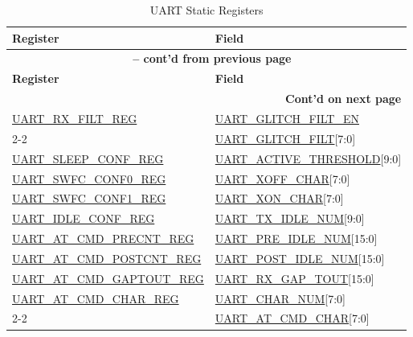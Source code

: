 \documentclass[main\_\_EN.tex]{subfiles}
\begin{document}
\begin{longtable}[c]{|m{6cm}|m{6cm}|}
\caption{UART Static Registers}
\label{tab:uart-static-reg} \\
    \hline
    \rowcolor{lightgray}
        \textbf{Register} & \textbf{Field} \\\hline
    \endfirsthead
        \multicolumn{2}{c}{\bfseries \tablename\ \thetable{} -- cont'd from previous page}\\\hline

    \rowcolor{lightgray}
        \textbf{Register} & \textbf{Field} \\\hline
    \endhead

        \multicolumn{2}{r}{\textbf{Cont'd on next page}} \\
    \endfoot
    \endlastfoot
    \hline

\hyperref[regdesc:UARTRXFILTREG]{UART\_RX\_FILT\_REG} & \hyperref[fielddesc:UARTGLITCHFILTEN]{UART\_GLITCH\_FILT\_EN} \\\cline{2-2}
 & \hyperref[fielddesc:UARTGLITCHFILT]{UART\_GLITCH\_FILT}[7:0] \\\hline
\hyperref[regdesc:UARTSLEEPCONFREG]{UART\_SLEEP\_CONF\_REG} & \hyperref[fielddesc:UARTACTIVETHRESHOLD]{UART\_ACTIVE\_THRESHOLD}[9:0] \\\hline
\hyperref[regdesc:UARTSWFCCONF0REG]{UART\_SWFC\_CONF0\_REG} & \hyperref[fielddesc:UARTXOFFCHAR]{UART\_XOFF\_CHAR}[7:0] \\\hline
\hyperref[regdesc:UARTSWFCCONF1REG]{UART\_SWFC\_CONF1\_REG} & \hyperref[fielddesc:UARTXONCHAR]{UART\_XON\_CHAR}[7:0] \\\hline
\hyperref[regdesc:UARTIDLECONFREG]{UART\_IDLE\_CONF\_REG} & \hyperref[fielddesc:UARTTXIDLENUM]{UART\_TX\_IDLE\_NUM}[9:0] \\\hline
\hyperref[regdesc:UARTATCMDPRECNTREG]{UART\_AT\_CMD\_PRECNT\_REG} & \hyperref[fielddesc:UARTPREIDLENUM]{UART\_PRE\_IDLE\_NUM}[15:0] \\\hline
\hyperref[regdesc:UARTATCMDPOSTCNTREG]{UART\_AT\_CMD\_POSTCNT\_REG} & \hyperref[fielddesc:UARTPOSTIDLENUM]{UART\_POST\_IDLE\_NUM}[15:0] \\\hline
\hyperref[regdesc:UARTATCMDGAPTOUTREG]{UART\_AT\_CMD\_GAPTOUT\_REG} & \hyperref[fielddesc:UARTRXGAPTOUT]{UART\_RX\_GAP\_TOUT}[15:0] \\\hline
\hyperref[regdesc:UARTATCMDCHARREG]{UART\_AT\_CMD\_CHAR\_REG} & \hyperref[fielddesc:UARTCHARNUM]{UART\_CHAR\_NUM}[7:0] \\\cline{2-2}
 & \hyperref[fielddesc:UARTATCMDCHAR]{UART\_AT\_CMD\_CHAR}[7:0] \\\hline
\end{longtable}
\end{document}

